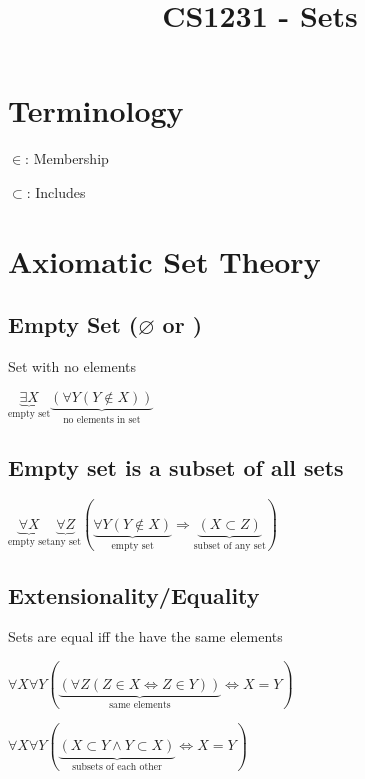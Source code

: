 \documentclass[12pt]{article}
\title{\textbf{CS1231 - Sets}}
\date{}
\begin{document}
\maketitle

\begin{spacing}{1.5}

\section{Terminology}

\begin{itemize*}
	\item $\in$: Membership
	\item $\subset$: Includes
\end{itemize*}

\section{Axiomatic Set Theory}

\subsection{Empty Set ($\varnothing$ or ${}$)}

Set with no elements

$\underbrace{\exists X}_{\textrm{empty set}} \underbrace{(\forall Y (Y \notin X))}_{\textrm{no elements in set}}$

\subsection{Empty set is a subset of all sets}

$\underbrace{\forall X}_{\textrm{empty set}}  \underbrace{\forall Z}_{\textrm{any set}} ( \underbrace{\forall Y (Y \notin X)}_{\textrm{empty set}} \Rightarrow \underbrace{(X \subset Z)}_{\textrm{subset of any set}})$

\subsection{Extensionality/Equality}

Sets are equal iff the have the same elements

$\forall X \forall Y (\underbrace{(\forall Z (Z \in X \Leftrightarrow Z \in Y))}_{\textrm{same elements}} \Leftrightarrow X = Y)$

$\forall X \forall Y (\underbrace{(X \subset Y \wedge Y \subset X)}_{\textrm{subsets of each other}} \Leftrightarrow X = Y)$


\end{spacing}
\end{document}
